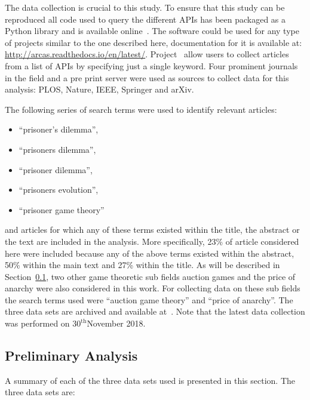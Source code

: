 \documentclass{article}
\theoremstyle{definition}
\begin{document}
The data collection is crucial to this study. To ensure that this study can be
reproduced all code used to query the different APIs has been packaged as a
Python library and is available online~\cite{nikoleta_2017}. The software could
be used for any type of projects similar to the one described here,
documentation for it is available at:
\url{http://arcas.readthedocs.io/en/latest/}. Project~\cite{nikoleta_2017} allow
users to collect articles from a list of APIs by specifying just a single
keyword. Four prominent journals in the field and a pre print server were used
as sources to collect data for this analysis: PLOS, Nature, IEEE, Springer and
arXiv.

The following series of search terms were used to identify relevant articles:

\begin{itemize}
    \item ``prisoner's dilemma'',
    \item ``prisoners dilemma'',
    \item ``prisoner dilemma'',
    \item ``prisoners evolution'',
    \item ``prisoner game theory''
\end{itemize}

and articles for which any of these terms existed within the title, the abstract
or the text are included in the analysis. More specifically, 23\% of article
considered here were included because any of the above terms existed within the
abstract, 50\% within the main text and 27\% within the title. As will be
described in Section~\ref{section:preliminary_analysis}, two other game
theoretic sub fields auction games and the price of anarchy were also considered
in this work. For collecting data on these sub fields the search terms used were
``auction game theory'' and ``price of anarchy''. The three data sets are
archived and available at~\cite{auction_data_2018, anarchy_data_2018,
pd_data_2018}. Note that the latest data collection was performed on \(30^{\text{th}}\)November 2018.

\subsection{Preliminary Analysis}\label{section:preliminary_analysis}

A summary of each of the three data sets used is presented in this section.
The three data sets are:
\end{document}

